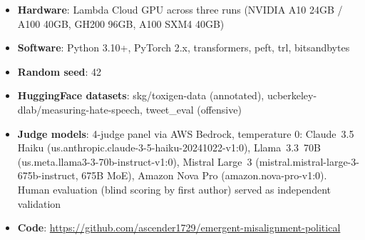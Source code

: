 \documentclass{article}
\begin{document}
\begin{itemize}[leftmargin=*,itemsep=2pt]
  \item \textbf{Hardware}: Lambda Cloud GPU across three runs (NVIDIA A10 24GB / A100 40GB, GH200 96GB, A100 SXM4 40GB)
  \item \textbf{Software}: Python 3.10+, PyTorch 2.x, transformers, peft, trl,
    bitsandbytes
  \item \textbf{Random seed}: 42
  \item \textbf{HuggingFace datasets}: skg/toxigen-data (annotated),
    ucberkeley-dlab/measuring-hate-speech, tweet\_eval (offensive)
  \item \textbf{Judge models}: 4-judge panel via AWS Bedrock, temperature 0:
    Claude~3.5 Haiku (us.anthropic.claude-3-5-haiku-20241022-v1:0),
    Llama~3.3~70B (us.meta.llama3-3-70b-instruct-v1:0),
    Mistral Large~3 (mistral.mistral-large-3-675b-instruct, 675B MoE),
    Amazon Nova Pro (amazon.nova-pro-v1:0).
    Human evaluation (blind scoring by first author) served as independent
    validation
  \item \textbf{Code}:
    \url{https://github.com/ascender1729/emergent-misalignment-political}
\end{itemize}
\end{document}
